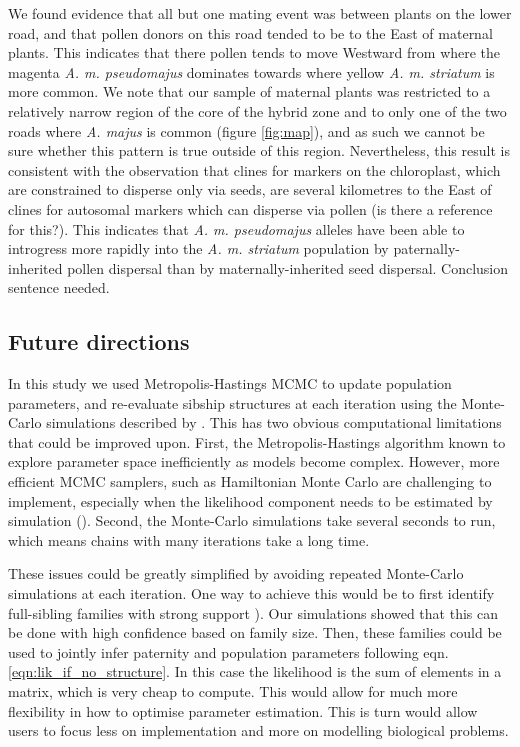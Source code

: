 \documentclass[10pt, a4paper, twocolumn]{article} %
\begin{document}
We found evidence that all but one mating event was between plants on the lower road, and that pollen donors on this road tended to be to the East of maternal plants.
This indicates that there pollen tends to move Westward from where the magenta \textit{A. m. pseudomajus} dominates towards where yellow \textit{A. m. striatum} is more common.
We note that our sample of maternal plants was restricted to a relatively narrow region of the core of the hybrid zone and to only one of the two roads where \textit{A. majus} is common (figure \ref{fig:map}), and as such we cannot be sure whether this pattern is true outside of this region.
Nevertheless, this result is consistent with the observation that clines for markers on the chloroplast, which are constrained to disperse only via seeds, are several kilometres to the East of clines for autosomal markers which can disperse via pollen (is there a reference for this?).
This indicates that \textit{A. m. pseudomajus} alleles have been able to introgress more rapidly into the \textit{A. m. striatum} population by paternally-inherited pollen dispersal than by maternally-inherited seed dispersal.
Conclusion sentence needed. 

\subsection{Future directions}

In this study we used Metropolis-Hastings MCMC to update population parameters, and re-evaluate sibship structures at each iteration using the Monte-Carlo simulations described by \cite{ellis2018efficient}.
This has two obvious computational limitations that could be improved upon.
First, the Metropolis-Hastings algorithm known to explore parameter space inefficiently as models become complex.
However, more efficient MCMC samplers, such as Hamiltonian Monte Carlo are challenging to implement, especially when the likelihood component needs to be estimated by simulation (\cite{betancourt2017conceptual}).
Second, the Monte-Carlo simulations take several seconds to run, which means chains with many iterations take a long time.

These issues could be greatly simplified by avoiding repeated Monte-Carlo simulations at each iteration.
One way to achieve this would be to first identify full-sibling families with strong support \cite{ellis2018efficient}).
Our simulations showed that this can be done with high confidence based on family size.
Then, these families could be used to jointly infer paternity and population parameters following eqn. \ref{eqn:lik_if_no_structure}.
In this case the likelihood is the sum of elements in a matrix, which is very cheap to compute.
This would allow for much more flexibility in how to optimise parameter estimation.
This is turn would allow users to focus less on implementation and more on modelling biological problems.
\end{document}
